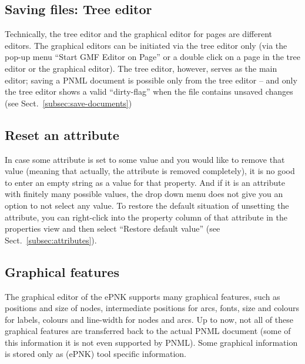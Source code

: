 \subsection{Saving files: Tree editor}
Technically, the tree editor and the graphical editor for pages are
different editors. The graphical editors can be initiated via
the tree editor only (via the pop-up menu ``Start GMF Editor on Page'' or
a double click on a page in the tree editor or the graphical editor).
The tree editor, however, serves as the main editor; saving a PNML document
is possible only from the tree editor -- and only the tree editor
shows a valid ``dirty-flag'' when the file contains unsaved changes
(see Sect.~\ref{subsec:save-documents})

\subsection{Reset an attribute}
\label{subsec:user:reset-attribute}
In case some attribute is set to some value and you would like to remove
that value (meaning that actually, the attribute is removed completely),
it is no good to enter an empty string as a value for that property. And
if it is an attribute with finitely many possible values, the drop down
menu does not give you an option to not select any value. To restore
the default situation of unsetting the attribute, you can right-click
into the property column of that attribute in the properties view and then
select ``Restore default value'' (see Sect.~\ref{subsec:attributes}).


\subsection{Graphical features}
\label{subsec:supported-graphical-features}

The graphical editor of the ePNK supports many graphical features, such as
positions and size of nodes, intermediate positions for arcs, fonts, size and
colours for labels, colours and line-width for nodes and arcs. Up to now, not
all of these graphical features are transferred back to the actual
PNML document (some of this information it is not even supported by PNML).
Some graphical information is stored only as (ePNK) tool specific information.

